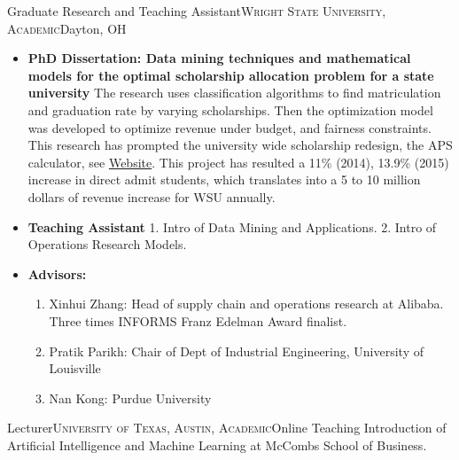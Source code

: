 \documentclass[12pt,a4paper,roman]{moderncv} %
\begin{document}
\bigskip
{} {Graduate Research and Teaching
Assistant}{\textsc{Wright State University, Academic}}{Dayton, OH}{}{
\begin{itemize}
\item \textbf{PhD Dissertation: Data mining techniques and mathematical models for the optimal scholarship allocation problem for a state university}
\newline
The research uses classification algorithms to find
matriculation and graduation rate by varying scholarships. Then the
optimization model was developed to optimize revenue under budget, and fairness constraints.
This research has prompted the university wide scholarship redesign, the APS
calculator, see \href{http://www.wright.edu/raider-connect/financial-aid/first-year-scholarships}{Website}. 
This project has resulted a 11\% (2014), 13.9\% (2015) increase in direct admit
students, which translates into a 5 to 10 million dollars of revenue increase
for WSU annually.
\item \textbf{Teaching Assistant}
1. Intro of Data Mining and Applications. 
2. Intro of Operations Research Models.
\item \textbf{Advisors:}
\begin{enumerate}
\item Xinhui Zhang: Head of supply chain and operations research at Alibaba. Three times INFORMS Franz Edelman Award finalist.
\item Pratik Parikh: Chair of Dept of Industrial Engineering, University of Louisville
\item Nan Kong: Purdue University  
\end{enumerate}
\end{itemize}
 }
 
{} {Lecturer}{\textsc{University of Texas, Austin, Academic}}{Online}{}{
Teaching Introduction of Artificial Intelligence and Machine Learning at McCombs School of Business.}

\end{document}

